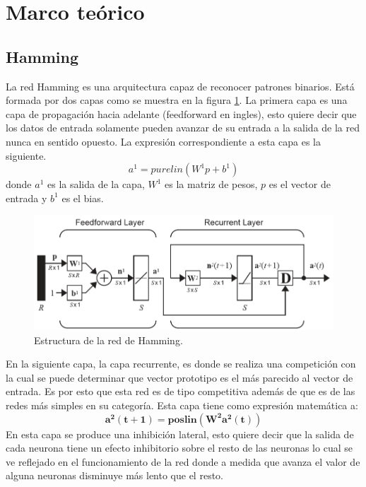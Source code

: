 \section{Marco teórico}
        \subsection{Hamming}
        La red Hamming es una arquitectura capaz de reconocer patrones binarios. Está formada por dos capas como se muestra en la figura \ref{fig:hamming-diagrama}. La primera capa es una capa de propagación hacia adelante (feedforward en ingles), esto quiere decir que los datos de entrada solamente pueden avanzar de su entrada a la salida de la red nunca en sentido opuesto.
        La expresión correspondiente a esta capa es la siguiente.
        \[ a^1=purelin(W^1p+b^1) \]
        donde $a^1$ es la salida de la capa, $W^1$ es la matriz de pesos, $p$ es el vector de entrada y $b^1$ es el bias.
        \begin{figure}[H]
            \begin{center}
                \includegraphics[width=16cm]{img/hamming/diagrama.png}
                \caption{Estructura de la red de Hamming. \cite{libro1}}
                \label{fig:hamming-diagrama}
            \end{center}
        \end{figure}
        En la siguiente capa, la capa recurrente, es donde se realiza una competición con la cual se puede determinar que vector prototipo es el más parecido al vector de entrada.\cite{libro1}
        Es por esto que esta red es de tipo competitiva además de que es de las redes más simples en su categoría.
        Esta capa tiene como expresión matemática a:
        \[\boldsymbol{a^2(t+1) = poslin(W^2a^2(t))}\]
        En esta capa se produce una inhibición lateral, esto quiere decir que la salida de cada neurona tiene un efecto inhibitorio sobre el resto de las neuronas lo cual se ve reflejado en el funcionamiento de la red donde a medida que avanza el valor de alguna neuronas disminuye más lento que el resto. \cite{libro1} 
        
